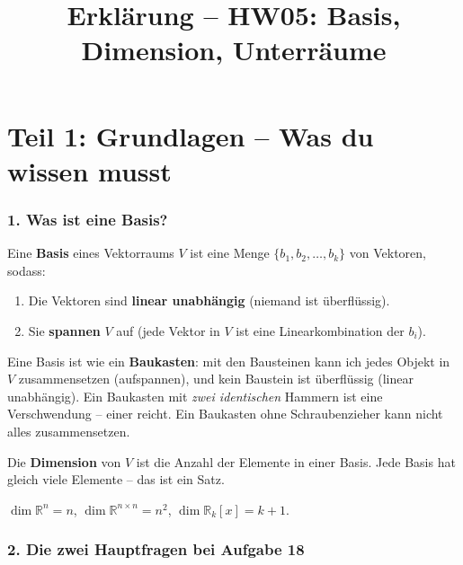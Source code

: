 \documentclass[a4paper,12pt]{article}
\title{Erkl\"arung -- HW05: Basis, Dimension, Unterr\"aume}
\author{}
\date{}
\begin{document}
\maketitle

\part*{Teil 1: Grundlagen -- Was du wissen musst}

\section*{1. Was ist eine Basis?}

Eine \textbf{Basis} eines Vektorraums $V$ ist eine Menge $\{b_1, b_2, \dots, b_k\}$ von Vektoren, sodass:
\begin{enumerate}[nosep]
    \item Die Vektoren sind \textbf{linear unabh\"angig} (niemand ist \"uberfl\"ussig).
    \item Sie \textbf{spannen} $V$ auf (jede Vektor in $V$ ist eine Linearkombination der $b_i$).
\end{enumerate}

\begin{analogie}
Eine Basis ist wie ein \textbf{Baukasten}: mit den Bausteinen kann ich jedes Objekt in $V$ zusammensetzen (aufspannen), und kein Baustein ist \"uberfl\"ussig (linear unabh\"angig). Ein Baukasten mit \emph{zwei identischen} Hammern ist eine Verschwendung -- einer reicht. Ein Baukasten ohne Schraubenzieher kann nicht alles zusammensetzen.
\end{analogie}

\begin{merkbox}[title={Dimension}]
Die \textbf{Dimension} von $V$ ist die Anzahl der Elemente in einer Basis. Jede Basis hat gleich viele Elemente -- das ist ein Satz.

$\dim \mathbb{R}^n = n$, $\dim \mathbb{R}^{n \times n} = n^2$, $\dim \mathbb{R}_k[x] = k+1$.
\end{merkbox}

\section*{2. Die zwei Hauptfragen bei Aufgabe 18}
\end{document}

